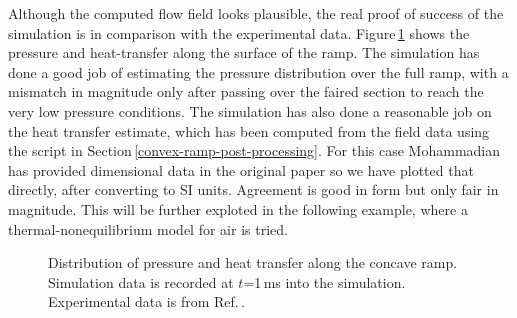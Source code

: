 \medskip
Although the computed flow field looks plausible,
the real proof of success of the simulation is in comparison with the experimental data.
Figure\,\ref{fig:convex-ramp-data-compare} shows the pressure and heat-transfer
along the surface of the ramp.
The simulation has done a good job of estimating the pressure distribution over the full ramp,
with a mismatch in magnitude only after passing over the faired section to reach the 
very low pressure conditions.
The simulation has also done a reasonable job on the heat transfer estimate,
which has been computed from the field data using the script in Section\,\ref{convex-ramp-post-processing}.
For this case Mohammadian has provided dimensional data in the original paper so we have plotted
that directly, after converting to SI units.
Agreement is good in form but only fair in magnitude.
This will be further exploted in the following example, where a thermal-nonequilibrium model for air
is tried.

\begin{figure}[htbp]
 \centering
 \caption{Distribution of pressure and heat transfer along the concave ramp.
   Simulation data is recorded at $t$=1\,ms into the simulation.
   Experimental data is from Ref.\,\cite{mohammadian_1972a}.}
 \label{fig:convex-ramp-data-compare}
\end{figure}


